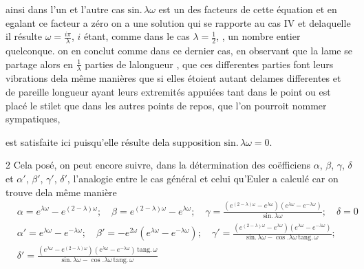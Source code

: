 \documentclass[11pt,a4paper]{article}
\begin{document}
ainsi dans l'un et l'autre cas $\text{sin.}\,\lambda\omega$ est un des
facteurs de cette équation et en egalant ce facteur a zéro on a une solution
\struck{\ill{}} qui se rapporte au cas IV et delaquelle il résulte
$\omega=\frac{i\pi}{\lambda}$, $i$ étant, comme dans le cas
$\lambda=\frac{1}{2}$, , un nombre entier
quelconque. on en conclut  comme dans ce dernier cas, en
observant que la lame se partage alors en $\frac{1}{\lambda}$ parties de
lalongueur , que ces differentes parties font leurs
vibrations dela même manières que si elles étoient autant delames
differentes et de pareille longueur ayant leurs extremités appuiées tant dans
le point ou est placé le stilet que dans les autres points de repos, que l'on
pourroit nommer sympatiques,



est satisfaite ici puisqu'elle résulte dela supposition
$\text{sin.}\,\lambda\omega=0$.

2 Cela posé, on peut encore suivre, dans la détermination des coëfficiens
$\alpha$, $\beta$, $\gamma$, $\delta$ et $\alpha'$, $\beta'$, $\gamma'$,
$\delta'$, l'analogie entre le cas général et celui qu'Euler a calculé car on
trouve dela même manière
\begin{align*}
&\alpha=e^{\lambda\omega}-e^{(2-\lambda)\omega};\quad \beta=e^{(2-\lambda)\omega}-e^{\lambda\omega};\quad \gamma=\frac{(e^{(2-\lambda)\omega}-e^{\lambda\omega})(e^{\lambda\omega}-e^{-\lambda\omega})}{\text{sin.}\,\lambda\omega};\quad \delta=0 \\
&\alpha'=e^{\lambda\omega}-e^{-\lambda\omega};\quad \beta'=-e^{2\omega}(e^{\lambda\omega}-e^{-\lambda\omega});\quad \gamma'=\frac{(e^{(2-\lambda)\omega}-e^{\lambda\omega})(e^{\lambda\omega}-e^{-\lambda\omega})}{\text{sin.}\,\lambda\omega-\cos.\lambda\omega\,\text{tang.}\,\omega}; \\
&\delta'=\frac{(e^{\lambda\omega}-e^{(2-\lambda)\omega})(e^{\lambda\omega}-e^{-\lambda\omega})\,\text{tang.}\,\omega}{\text{sin.}\,\lambda\omega-\cos.\lambda\omega\,\text{tang.}\,\omega}
\end{align*}
\end{document}
